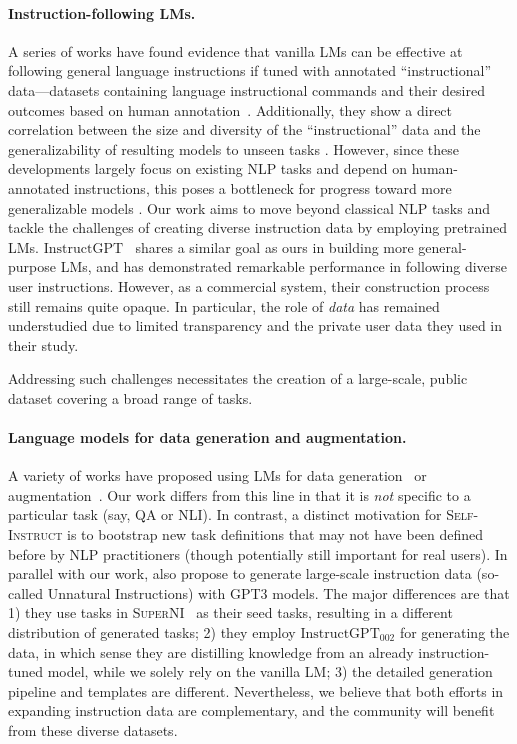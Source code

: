 \paragraph{Instruction-following LMs.} A series of works have found evidence that vanilla LMs can be effective at following general language instructions if tuned with annotated ``instructional'' data---datasets containing language instructional commands and their desired outcomes based on human annotation~\cite[i.a.]{weller2020learning, mishra2022cross,wei2022finetuned,sanh2022multitask}. Additionally, they show a direct correlation between the size and diversity of the ``instructional'' data and the generalizability of resulting models to unseen tasks \citep{wang2022benchmarking,chung2022scaling}. However, since these developments largely focus on existing NLP tasks and depend on human-annotated instructions, this poses a bottleneck for progress toward more generalizable models 
\cite[e.g., see Fig.~5a in][]{wang2022benchmarking}. Our work aims to move beyond classical NLP tasks and tackle the challenges of creating diverse instruction data by employing pretrained LMs.
$\text{InstructGPT}_{\text{}}$~\cite{ouyang2022training} shares a similar goal as ours in building more general-purpose LMs, and has demonstrated remarkable performance in following diverse user instructions. However, as a commercial system, their construction process still remains quite opaque. In particular, the role of \emph{data} has remained understudied due to limited transparency and the private user data they used in their study.

Addressing such challenges necessitates the creation of a large-scale, public dataset covering a broad range of tasks.

\paragraph{Language models for data generation and augmentation.} A variety of works have proposed using LMs for data generation~\cite{schick2021generating,wang2021towards,liu2022wanli,meng2022tuning} or augmentation~\cite{feng2021survey,yang2020generative,mekala2022intermediate}. Our work differs from this line in that it is \emph{not} specific to a particular task (say, QA or NLI). In contrast, a distinct motivation for \textsc{Self-Instruct} is to bootstrap new task definitions that may not have been defined before by NLP practitioners (though potentially still important for real users).  In parallel with our work, \citet{honovich2022unnatural} also propose to generate large-scale instruction data (so-called Unnatural Instructions) with GPT3 models. The major differences are that 1) they use tasks in \textsc{SuperNI}~\citep{wang2022benchmarking} as their seed tasks, resulting in a different distribution of generated tasks; 2) they employ $\text{InstructGPT}_{\text{002}}$ for generating the data, in which sense they are distilling knowledge from an already instruction-tuned model, while we solely rely on the vanilla LM; 3) the detailed generation pipeline and templates are different. Nevertheless, we believe that both efforts in expanding instruction data are complementary, and the community will benefit from these diverse datasets.


